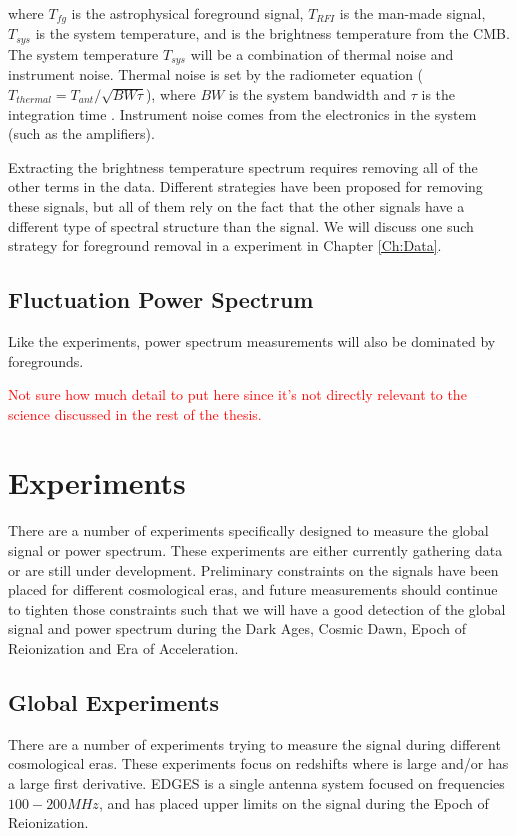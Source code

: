 where $T_{fg}$ is the astrophysical foreground signal, $T_{RFI}$ is the man-made signal, $T_{sys}$ is the system temperature, and \tb is the brightness temperature from the CMB. The system temperature $T_{sys}$ will be a combination of thermal noise and instrument noise. Thermal noise is set by the radiometer equation ($T_{thermal} = T_{ant}/\sqrt{BW \tau}$), where $BW$ is the system bandwidth and $\tau$ is the integration time \cite{carroll2007}. Instrument noise comes from the electronics in the system (such as the amplifiers). 

Extracting the \cm brightness temperature spectrum requires removing all of the other terms in the data. Different strategies have been proposed for removing these signals, but all of them rely on the fact that the other signals have a different type of spectral structure than the \cm signal. We will discuss one such strategy for foreground removal in a \avgdtb experiment in Chapter \ref{Ch:Data}.

\subsection{\cm Fluctuation Power Spectrum}
Like the \avgdtb experiments, power spectrum measurements will also be dominated by foregrounds. 

\textcolor{red}{Not sure how much detail to put here since it's not directly relevant to the science discussed in the rest of the thesis.}


\section{\cm Experiments}
There are a number of experiments specifically designed to measure the \cm global signal or power spectrum. These experiments are either currently gathering data or are still under development. Preliminary constraints on the \cm signals have been placed for different cosmological eras, and future measurements should continue to tighten those constraints such that we will have a good detection of the \cm global signal and power spectrum during the Dark Ages, Cosmic Dawn, Epoch of Reionization and Era of Acceleration. 

\subsection{Global Experiments}
There are a number of experiments trying to measure the \avgdtb signal during different cosmological eras. These experiments focus on redshifts where \dtb is large and/or has a large first derivative. EDGES \cite{bowman_2008} is a single antenna system focused on frequencies $100-200 MHz$, and has placed upper limits on the signal during the Epoch of Reionization. 

